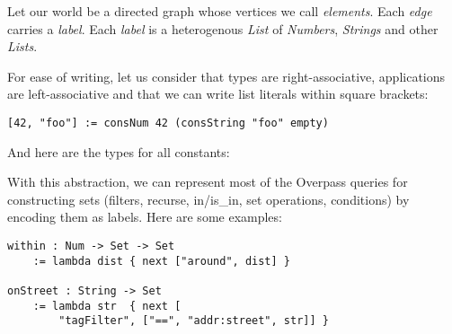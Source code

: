 \documentclass[main.tex]{subfiles}
\begin{document}
Let our world be a directed graph whose vertices we call \emph{elements}.
Each \emph{edge} carries a \emph{label}. Each \emph{label} is a heterogenous
\emph{List} of \emph{Numbers}, \emph{Strings} and other \emph{Lists}.

For ease of writing, let us consider that types are right-associative,
applications are left-associative and that we can write list literals
within square brackets:
\begin{lstlisting}
[42, "foo"] := consNum 42 (consString "foo" empty)
\end{lstlisting}

And here are the types for all constants:


With this abstraction, we can represent most of the Overpass queries for
constructing sets (filters, recurse, in/is_in, set operations, conditions)
by encoding them as labels. Here are some examples:

\begin{lstlisting}
within : Num -> Set -> Set
    := lambda dist { next ["around", dist] }

onStreet : String -> Set
    := lambda str  { next [
        "tagFilter", ["==", "addr:street", str]] }
\end{lstlisting}
\end{document}
